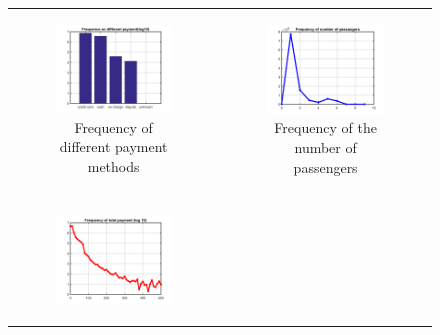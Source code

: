 \documentclass{article}
\begin{document}
\begin{figure}[H]

\begin{tabular}{cc}

\begin{subfigure}{.5\linewidth}
  \centering
  \includegraphics[width=.8\linewidth]{frequency-payment}
  \caption{Frequency of different payment methods}
  \label{sub:payment}
\end{subfigure} & 
\begin{subfigure}{.5\linewidth}
  \centering
  \includegraphics[width=.8\linewidth]{passange_frequency}
  \caption{Frequency of the number of passengers}
  \label{sub:num_pass}
\end{subfigure} \\\\
\begin{subfigure}{.5\linewidth}
  \centering
  \includegraphics[width=.8\linewidth]{frequency-totalpayment}

\end{subfigure}
\end{tabular}
\end{figure}
\end{document}
